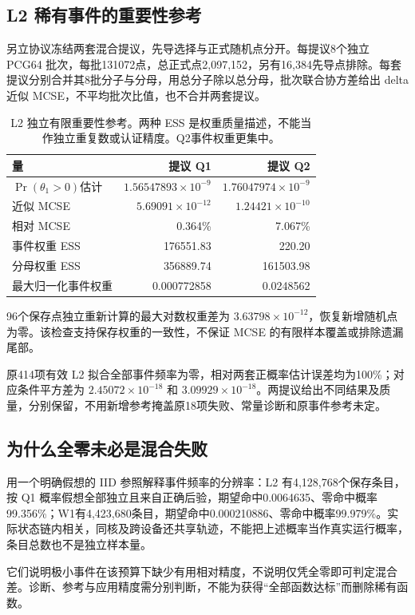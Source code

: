 \documentclass[UTF8,zihao=-4,a4paper,fontset=fandol]{ctexart}
\begin{document}
\subsection{L2 稀有事件的重要性参考}
另立协议冻结两套混合提议，先导选择与正式随机点分开。每提议8个独立 PCG64 批次，每批131072点，总正式点2,097,152，另有16,384先导点排除。每套提议分别合并其8批分子与分母，用总分子除以总分母，批次联合协方差给出 delta 近似 MCSE，不平均批次比值，也不合并两套提议\cite{owen}。
\begin{table}[htbp]\centering\smalltable
\begin{tabular}{lrr}\toprule
量 & 提议 Q1 & 提议 Q2\\\midrule
$\Pr(\theta_1>0)$估计 & $1.56547893\times10^{-9}$ & $1.76047974\times10^{-9}$\\
近似 MCSE & $5.69091\times10^{-12}$ & $1.24421\times10^{-10}$\\
相对 MCSE & 0.364\% & 7.067\%\\
事件权重 ESS & 176551.83 & 220.20\\
分母权重 ESS & 356889.74 & 161503.98\\
最大归一化事件权重 & 0.000772858 & 0.0248562\\\bottomrule
\end{tabular}
\caption{L2 独立有限重要性参考。两种 ESS 是权重质量描述，不能当作独立重复数或认证精度。Q2事件权重更集中。}
\end{table}
96个保存点独立重新计算的最大对数权重差为 $3.63798\times10^{-12}$，恢复新增随机点为零。该检查支持保存权重的一致性，不保证 MCSE 的有限样本覆盖或排除遗漏尾部。

原414项有效 L2 拟合全部事件频率为零，相对两套正概率估计误差均为100\%；对应条件平方差为 $2.45072\times10^{-18}$ 和 $3.09929\times10^{-18}$。两提议给出不同结果及质量，分别保留，不用新增参考掩盖原18项失败、常量诊断和原事件参考未定。

\subsection{为什么全零未必是混合失败}
用一个明确假想的 IID 参照解释事件频率的分辨率：L2 有4,128,768个保存条目，按 Q1 概率假想全部独立且来自正确后验，期望命中0.0064635、零命中概率99.356\%；W1有4,423,680条目，期望命中0.000210886、零命中概率99.979\%。实际状态链内相关，同核及跨设备还共享轨迹，不能把上述概率当作真实运行概率，条目总数也不是独立样本量。

它们说明极小事件在该预算下缺少有用相对精度，不说明仅凭全零即可判定混合差。诊断、参考与应用精度需分别判断，不能为获得“全部函数达标”而删除稀有函数。
\end{document}
